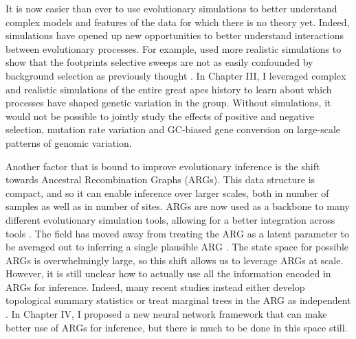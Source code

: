 %
It is now easier than ever to use evolutionary simulations to better understand complex models and features of the data for which there is no theory yet.
Indeed, simulations have opened up new opportunities to better understand interactions between evolutionary processes.
For example, \citet{schrider_background_2020} used more realistic simulations to show that the footprints selective sweeps are not as easily confounded by background selection as previously thought \citep{andolfatto_adaptive_2001}.
In Chapter III, I leveraged complex and realistic simulations of the entire great apes history to learn about which processes have shaped genetic variation in the group.
Without simulations, it would not be possible to jointly study the effects of positive and negative selection, mutation rate variation and GC-biased gene conversion on large-scale patterns of genomic variation.

Another factor that is bound to improve evolutionary inference is the shift towards Ancestral Recombination Graphs (ARGs).
This data structure is compact, and so it can enable inference over larger scales, both in number of samples as well as in number of sites.
ARGs are now used as a backbone to many different evolutionary simulation tools, allowing for a better integration across tools \citep{haller_tree-sequence_2019, kelleher_efficient_2016-1}.
The field has moved away from treating the ARG as a latent parameter to be averaged out \citep{griffiths_ancestral_1996, nielsen_estimation_2000}
to inferring a single plausible ARG \citep{kelleher_inferring_2019, speidel_method_2019}.
The state space for possible ARGs is overwhelmingly large, so  this shift allows us to leverage ARGs at scale.
However, it is still unclear how to actually use all the information encoded in ARGs for inference.
Indeed, many recent studies instead either develop topological summary statistics or treat marginal trees in the ARG as independent \citep{hejase_deep-learning_2022, fan_likelihood-based_2023}.
In Chapter IV, I proposed a new neural network framework that can make better use of ARGs for inference,
but there is much to be done in this space still.

